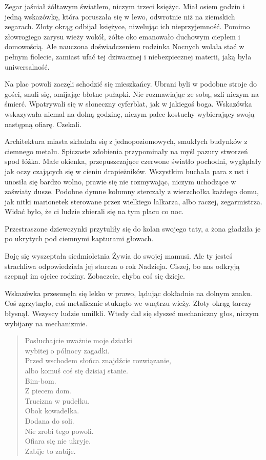 Zegar jaśniał żółtawym światłem, niczym trzeci księżyc.
Miał osiem godzin i jedną wskazówkę, która poruszała się w lewo, odwrotnie niż na ziemskich zegarach.
Złoty okrąg odbijał księżyce, niwelując ich nieprzyjemność.
Pomimo złowrogiego zarysu wieży wokół, żółte oko emanowało duchowym ciepłem i domowością.
Ale nauczona doświadczeniem rodzinka Nocnych wolała stać w pełnym fiolecie, zamiast ufać tej dziwacznej i niebezpiecznej materii, jaką była uniwersalność.

Na plac powoli zaczęli schodzić się mieszkańcy.
Ubrani byli w podobne stroje do gości, snuli się, omijając błotne pułapki.
Nie rozmawiając ze sobą, szli niczym na śmierć.
Wpatrywali się w słoneczny cyferblat, jak w jakiegoś boga.
Wskazówka wskazywała niemal na dolną godzinę, niczym palec kostuchy wybierający swoją następną ofiarę.
Czekali.

Architektura miasta składała się z jednopoziomowych, smukłych budynków z ciemnego metalu.
Spiczaste zdobienia przypominały na myśl pazury stworzeń spod łóżka.
Małe okienka, przepuszczające czerwone światło pochodni, wyglądały jak oczy czających się w cieniu drapieżników.
Wszystkim buchała para z ust i unosiła się bardzo wolno, prawie się nie rozmywając, niczym uchodzące w zaświaty dusze.
Podobne dymne kolumny sterczały z wierzchołka każdego domu, jak nitki marionetek sterowane przez wielkiego lalkarza, albo raczej, zegarmistrza.
Widać było, że ci ludzie zbierali się na tym placu co noc.

Przestraszone dziewczynki przytuliły się do kolan swojego taty, a żona gładziła je po ukrytych pod ciemnymi kapturami głowach.
\begin{dialogue}
	\ds{} Boję się \dm{} wyszeptała siedmioletnia Żywia do swojej mamusi.
	\ds{} Ale ty jesteś strachliwa \dm{} odpowiedziała jej starcza o rok Nadzieja.
	\ds{} Ciszej, bo nas odkryją \dm{} szepnął im ojciec rodziny. \dm{} Zobaczcie, chyba coś się dzieje.
\end{dialogue}

Wskazówka przesunęła się lekko w prawo, lądując dokładnie na dolnym znaku. 
Coś zgrzytnęło, coś metalicznie stuknęło we wnętrzu wieży.
Złoty okrąg tarczy błysnął.
Wszyscy ludzie umilkli.
Wtedy dał się słyszeć mechaniczny głos, niczym wybijany na mechanizmie.

\begin{sl}
\begin{quote}
Posłuchajcie uważnie moje dziatki \\
wybitej o północy zagadki. \\
Przed wschodem słońca znajdźcie rozwiązanie, \\
albo komuś coś się dzisiaj stanie. \\
Bim-bom. \\
Z piecem dom. \\
Trucizna w pudełku. \\
Obok kowadełka. \\
Dodana do soli. \\
Nie zrobi tego powoli. \\
Ofiara się nie ukryje. \\
Zabije to zabije. \\
\end{quote}
\end{sl}

